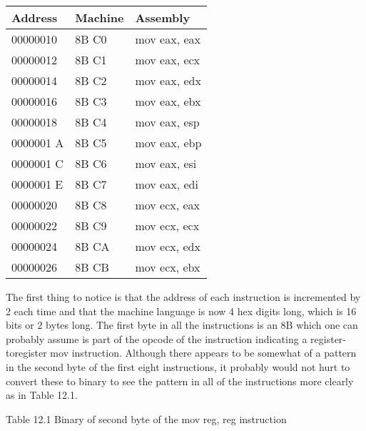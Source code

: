 \documentclass[10pt]{article}
\begin{document}
\begin{center}
\begin{tabular}{|l|l|l|}
\hline
Address & Machine & Assembly \\
\hline
00000010 & 8B C0 & mov eax, eax \\
\hline
00000012 & 8B C1 & mov eax, ecx \\
\hline
00000014 & 8B C2 & mov eax, edx \\
\hline
00000016 & 8B C3 & mov eax, ebx \\
\hline
00000018 & 8B C4 & mov eax, esp \\
\hline
0000001 A & 8B C5 & mov eax, ebp \\
\hline
0000001 C & 8B C6 & mov eax, esi \\
\hline
0000001 E & 8B C7 & mov eax, edi \\
\hline
00000020 & 8B C8 & mov ecx, eax \\
\hline
00000022 & 8B C9 & mov ecx, ecx \\
\hline
00000024 & 8B CA & mov ecx, edx \\
\hline
00000026 & 8B CB & mov ecx, ebx \\
\hline
\end{tabular}
\end{center}

The first thing to notice is that the address of each instruction is incremented by 2 each time and that the machine language is now 4 hex digits long, which is 16 bits or 2 bytes long. The first byte in all the instructions is an 8B which one can probably assume is part of the opcode of the instruction indicating a register-toregister mov instruction. Although there appears to be somewhat of a pattern in the second byte of the first eight instructions, it probably would not hurt to convert these to binary to see the pattern in all of the instructions more clearly as in Table 12.1.

Table 12.1 Binary of second byte of the mov reg, reg instruction
\end{document}
